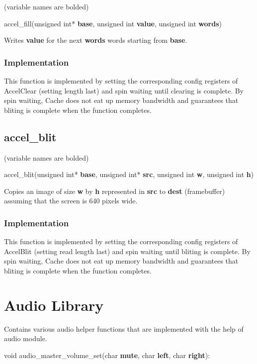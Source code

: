 \documentclass[10pt]{report}
\begin{document}
(variable names are bolded)

accel\_fill(unsigned int* \textbf{base}, unsigned int \textbf{value}, unsigned int \textbf{words})

Writes \textbf{value} for the next \textbf{words} words starting from \textbf{base}.

\subsubsection{Implementation}

This function is implemented by setting the corresponding config registers of AccelClear (setting length last) and spin waiting until clearing is complete. By spin waiting, Cache does not eat up memory bandwidth and guarantees that bliting is complete when the function completes.

\subsection{accel\_blit}

(variable names are bolded)

accel\_blit(unsigned int* \textbf{base}, unsigned int* \textbf{src}, unsigned int \textbf{w},
            unsigned int \textbf{h})

Copies an image of size \textbf{w} by \textbf{h} represented in \textbf{src} to \textbf{dest} 
(framebuffer) assuming that the screen is 640 pixels wide.

\subsubsection{Implementation}

This function is implemented by setting the corresponding config registers of AccelBlit (setting read length last) and spin waiting until bliting is complete. By spin waiting, Cache does not eat up memory bandwidth and guarantees that bliting is complete when the function completes. 

\section{Audio Library}
\label{sec:libaudio}

Contains various audio helper functions that are implemented with the help of audio module.

void audio\_master\_volume\_set(char \textbf{mute}, char \textbf{left}, char \textbf{right}):
\end{document}
